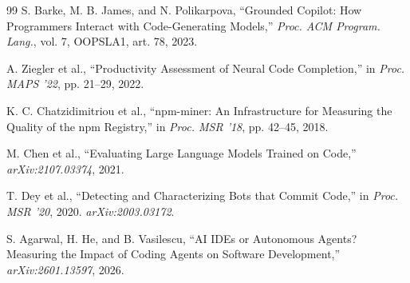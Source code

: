 \documentclass[11pt,a4paper]{article}
\begin{document}
\begin{thebibliography}{99}
S. Barke, M. B. James, and N. Polikarpova,
``Grounded Copilot: How Programmers Interact with Code-Generating Models,''
\textit{Proc. ACM Program. Lang.}, vol. 7, OOPSLA1, art. 78, 2023.

A. Ziegler et al.,
``Productivity Assessment of Neural Code Completion,''
in \textit{Proc. MAPS '22}, pp. 21--29, 2022.

K. C. Chatzidimitriou et al.,
``npm-miner: An Infrastructure for Measuring the Quality of the npm Registry,''
in \textit{Proc. MSR '18}, pp. 42--45, 2018.

M. Chen et al.,
``Evaluating Large Language Models Trained on Code,''
\textit{arXiv:2107.03374}, 2021.

T. Dey et al.,
``Detecting and Characterizing Bots that Commit Code,''
in \textit{Proc. MSR '20}, 2020. \textit{arXiv:2003.03172}.

S. Agarwal, H. He, and B. Vasilescu,
``AI IDEs or Autonomous Agents? Measuring the Impact of Coding Agents on Software Development,''
\textit{arXiv:2601.13597}, 2026.

\end{thebibliography}
\end{document}
